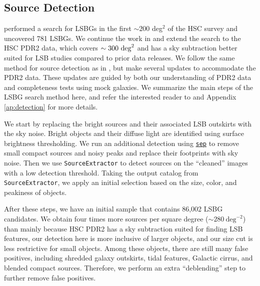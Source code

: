 \documentclass[twocolumn,astrosymb,twocolappendix]{aastex631}
\newcommand{\code}[1]{\texttt{#1}}
\begin{document}
\begin{CJK*}{UTF8}{gbsn}
\subsection{Source Detection}\label{sec:detection}
 performed a search for LSBGs in the first $\sim 200$ deg$^2$ of the HSC survey and uncovered 781 LSBGs. We continue the work in  and extend the search to the HSC PDR2 data, which covers $\sim 300\ \rm{deg}^{2}$ and has a sky subtraction better suited for LSB studies compared to prior data releases. We follow the same method for source detection as in , but make several updates to accommodate the PDR2 data. These updates are guided by both our understanding of PDR2 data and completeness tests using mock galaxies. We summarize the main steps of the LSBG search method here, and refer the interested reader to  and Appendix \ref{ap:detection} for more details. 

We start by replacing the bright sources and their associated LSB outskirts with the sky noise. Bright objects and their diffuse light are identified using surface brightness thresholding. We run an additional detection using \href{https://sep.readthedocs.io/en/v1.1.x}{\code{sep}} \citep{Barbary2016} to remove small compact sources and noisy peaks and replace their footprints with sky noise. Then we use \code{SourceExtractor} to detect sources on the ``cleaned'' images with a low detection threshold. Taking the output catalog from \code{SourceExtractor}, we apply an initial selection based on the size, color, and peakiness of objects. 

After these steps, we have an initial sample that contains 86,002 LSBG candidates. We obtain four times more sources per square degree ($\sim 280\ \mathrm{deg}^{-2}$) than  mainly because HSC PDR2 has a sky subtraction suited for finding LSB features, our detection here is more inclusive of larger objects, and our size cut is less restrictive for small objects. Among these objects, there are still many false positives, including shredded galaxy outskirts, tidal features, Galactic cirrus, and blended compact sources. Therefore, we perform an extra ``deblending'' step to further remove false positives.  




\end{CJK*}
\end{document}
